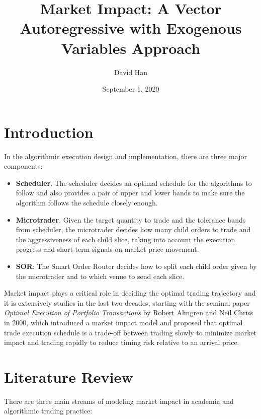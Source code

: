 \documentclass[a4paper]{article}
\title{Market Impact: A Vector Autoregressive with Exogenous Variables Approach}
\author{David Han}
\date{September 1, 2020}
\begin{document}
\clearpage
\maketitle
\thispagestyle{empty}

\section{Introduction}
In the algorithmic execution design and implementation, there are three major components:

\begin{itemize}
\item \textbf{Scheduler}. The scheduler decides an optimal schedule for the algorithms to follow and also provides a pair of upper and lower bands to make sure the algorithm follows the schedule closely enough.
\item \textbf{Microtrader}. Given the target quantity to trade and the tolerance bands from scheduler, the microtrader decides how many child orders to trade and the aggressiveness of each child slice, taking into account the execution progress and short-term signals on market price movement.
\item \textbf{SOR}: The Smart Order Router decides how to split each child order given by the microtrader and to which venue to send each slice.
\end{itemize}

Market impact plays a critical role in deciding the optimal trading trajectory and it is extensively studies in the last two decades, starting with the seminal paper \emph{Optimal Execution of Portfolio Transactions} by Robert Almgren and Neil Chriss in 2000, which introduced a market impact model and proposed that optimal trade execution schedule is a trade-off between trading slowly to minimize market impact and trading rapidly to reduce timing risk relative to an arrival price. 

\section{Literature Review}
There are three main streams of modeling market impact in academia and algorithmic trading practice:
\end{document}
